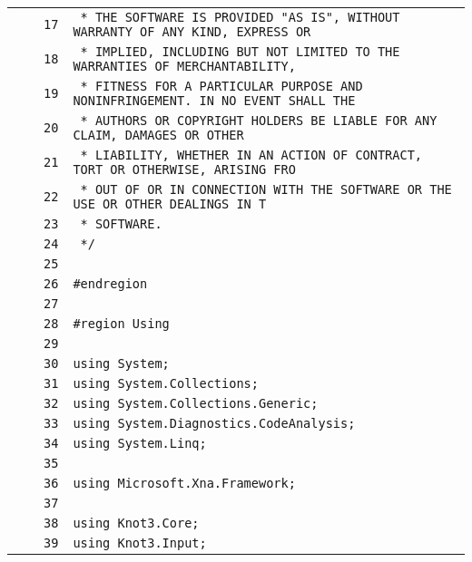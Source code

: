 \documentclass[a4paper,10pt]{article}
\begin{document}
\begin{longtable}[l]{lrrl}
\cellcolor{gray} &  & \verb~17~ & \verb~ * THE SOFTWARE IS PROVIDED "AS IS", WITHOUT WARRANTY OF ANY KIND, EXPRESS OR~\\
\cellcolor{gray} &  & \verb~18~ & \verb~ * IMPLIED, INCLUDING BUT NOT LIMITED TO THE WARRANTIES OF MERCHANTABILITY,~\\
\cellcolor{gray} &  & \verb~19~ & \verb~ * FITNESS FOR A PARTICULAR PURPOSE AND NONINFRINGEMENT. IN NO EVENT SHALL THE~\\
\cellcolor{gray} &  & \verb~20~ & \verb~ * AUTHORS OR COPYRIGHT HOLDERS BE LIABLE FOR ANY CLAIM, DAMAGES OR OTHER~\\
\cellcolor{gray} &  & \verb~21~ & \verb~ * LIABILITY, WHETHER IN AN ACTION OF CONTRACT, TORT OR OTHERWISE, ARISING FRO~\\
\cellcolor{gray} &  & \verb~22~ & \verb~ * OUT OF OR IN CONNECTION WITH THE SOFTWARE OR THE USE OR OTHER DEALINGS IN T~\\
\cellcolor{gray} &  & \verb~23~ & \verb~ * SOFTWARE.~\\
\cellcolor{gray} &  & \verb~24~ & \verb~ */~\\
\cellcolor{gray} &  & \verb~25~ & \verb~~\\
\cellcolor{gray} &  & \verb~26~ & \verb~#endregion~\\
\cellcolor{gray} &  & \verb~27~ & \verb~~\\
\cellcolor{gray} &  & \verb~28~ & \verb~#region Using~\\
\cellcolor{gray} &  & \verb~29~ & \verb~~\\
\cellcolor{gray} &  & \verb~30~ & \verb~using System;~\\
\cellcolor{gray} &  & \verb~31~ & \verb~using System.Collections;~\\
\cellcolor{gray} &  & \verb~32~ & \verb~using System.Collections.Generic;~\\
\cellcolor{gray} &  & \verb~33~ & \verb~using System.Diagnostics.CodeAnalysis;~\\
\cellcolor{gray} &  & \verb~34~ & \verb~using System.Linq;~\\
\cellcolor{gray} &  & \verb~35~ & \verb~~\\
\cellcolor{gray} &  & \verb~36~ & \verb~using Microsoft.Xna.Framework;~\\
\cellcolor{gray} &  & \verb~37~ & \verb~~\\
\cellcolor{gray} &  & \verb~38~ & \verb~using Knot3.Core;~\\
\cellcolor{gray} &  & \verb~39~ & \verb~using Knot3.Input;~\\

\end{longtable}
\end{document}

